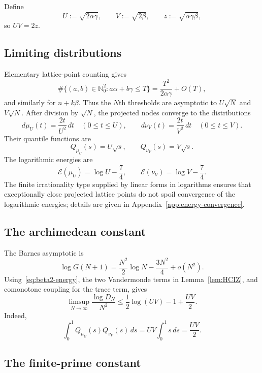 \documentclass[11pt,oneside]{article}
\theoremstyle{definition}
\theoremstyle{remark}
\newcommand{\Nzero}{\mathbb N_0}
\begin{document}
Define
\[
 U:=\sqrt{2\alpha\gamma},\qquad
 V:=\sqrt{2\beta},\qquad
 z:=\sqrt{\alpha\gamma\beta},
\]
so $UV=2z$.

\subsection{Limiting distributions}

Elementary lattice-point counting gives
\[
 \#\{(a,b)\in\Nzero^2:a\alpha+b\gamma\le T\}
 =\frac{T^2}{2\alpha\gamma}+O(T),
\]
and similarly for $n+k\beta$.  Thus the $N$th thresholds are asymptotic to
$U\sqrt N$ and $V\sqrt N$.  After division by $\sqrt N$, the projected nodes
converge to the distributions
\[
 d\mu_U(t)=\frac{2t}{U^2}\,dt\quad(0\le t\le U),\qquad
 d\nu_V(t)=\frac{2t}{V^2}\,dt\quad(0\le t\le V).
\]
Their quantile functions are
\[
 Q_{\mu_U}(s)=U\sqrt s,\qquad Q_{\nu_V}(s)=V\sqrt s.
\]
The logarithmic energies are
\begin{equation}\label{eq:beta2-energy}
 \mathcal E(\mu_U)=\log U-\frac74,\qquad
 \mathcal E(\nu_V)=\log V-\frac74.
\end{equation}
The finite irrationality type supplied by linear forms in logarithms ensures
that exceptionally close projected lattice points do not spoil convergence of
the logarithmic energies; details are given in
Appendix~\ref{app:energy-convergence}.

\subsection{The archimedean constant}

The Barnes asymptotic is
\[
 \log G(N+1)=\frac{N^2}{2}\log N-\frac{3N^2}{4}+o(N^2).
\]
Using~\eqref{eq:beta2-energy}, the two Vandermonde terms in
Lemma~\ref{lem:HCIZ}, and comonotone coupling for the trace term, gives
\begin{equation}\label{eq:triangle-upper}
 \limsup_{N\to\infty}\frac{\log D_N}{N^2}
 \le \frac12\log(UV)-1+\frac{UV}{2}.
\end{equation}
Indeed,
\[
 \int_0^1Q_{\mu_U}(s)Q_{\nu_V}(s)\,ds
 =UV\int_0^1s\,ds=\frac{UV}{2}.
\]

\subsection{The finite-prime constant}
\end{document}
